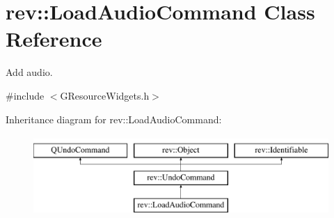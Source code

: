 \hypertarget{classrev_1_1_load_audio_command}{}\section{rev\+::Load\+Audio\+Command Class Reference}
\label{classrev_1_1_load_audio_command}


Add audio.  




{\ttfamily \#include $<$G\+Resource\+Widgets.\+h$>$}

Inheritance diagram for rev\+::Load\+Audio\+Command\+:\begin{figure}[H]
\begin{center}
\leavevmode
\includegraphics[height=3.000000cm]{classrev_1_1_load_audio_command}
\end{center}
\end{figure}

